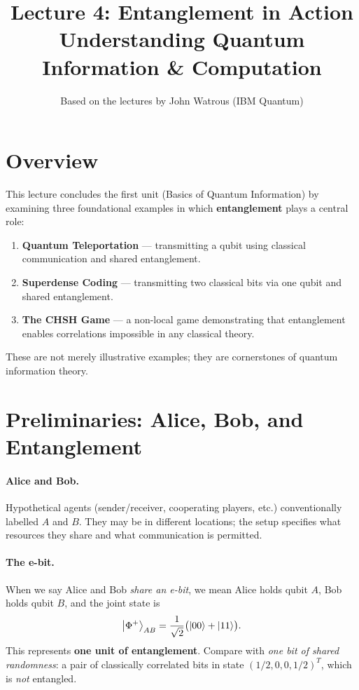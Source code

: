 \documentclass[11pt]{article}
\title{\textbf{Lecture 4: Entanglement in Action} \\ \large Understanding Quantum Information \& Computation}
\author{Based on the lectures by John Watrous (IBM Quantum)}
\date{}
\theoremstyle{definition}
\begin{document}
\maketitle
\tableofcontents
\newpage

\section{Overview}

This lecture concludes the first unit (Basics of Quantum Information) by examining three foundational examples in which \textbf{entanglement} plays a central role:

\begin{enumerate}
    \item \textbf{Quantum Teleportation} --- transmitting a qubit using classical communication and shared entanglement.
    \item \textbf{Superdense Coding} --- transmitting two classical bits via one qubit and shared entanglement.
    \item \textbf{The CHSH Game} --- a non-local game demonstrating that entanglement enables correlations impossible in any classical theory.
\end{enumerate}

These are not merely illustrative examples; they are cornerstones of quantum information theory.

\section{Preliminaries: Alice, Bob, and Entanglement}

\paragraph{Alice and Bob.}
Hypothetical agents (sender/receiver, cooperating players, etc.) conventionally labelled $A$ and $B$.  They may be in different locations; the setup specifies what resources they share and what communication is permitted.

\paragraph{The e-bit.}
When we say Alice and Bob \emph{share an e-bit}, we mean Alice holds qubit $A$, Bob holds qubit $B$, and the joint state is
\[
    \ket{\Phi^+}_{AB} = \frac{1}{\sqrt{2}}\bigl(\ket{00}+\ket{11}\bigr).
\]
This represents \textbf{one unit of entanglement}.  Compare with \emph{one bit of shared randomness}: a pair of classically correlated bits in state $(1/2,0,0,1/2)^T$, which is \emph{not} entangled.
\end{document}

